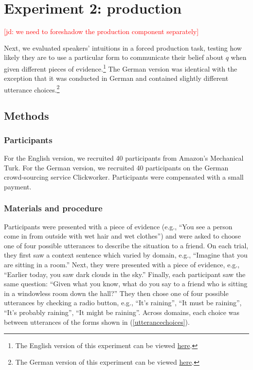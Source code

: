 \documentclass[11pt]{article}
\newcommand{\jd}[1]{\textcolor{Red}{[jd: #1]}}
\newcommand{\eref}[1]{(\ref{#1})}
\begin{document}
\section{Experiment 2: production}

\jd{we need to foreshadow the production component separately}

Next, we evaluated speakers' intuitions in a forced production task, testing how likely they are to use a particular form to communicate their belief about $q$ when given different pieces of evidence.\footnote{The English version of this experiment can be viewed \href{http://stanford.edu/~jdegen/71_modals_forced_production/modals.html}{here}.} The German version was identical with the exception that it was conducted in German and contained slightly different utterance choices.\footnote{The German version of this experiment can be viewed \href{http://web.stanford.edu/~jdegen/cgi-bin/3_dp_production/modals.html}{here}.}

\subsection{Methods}

\subsubsection{Participants}

For the English version, we recruited 40 participants from Amazon's Mechanical Turk. For the German version, we recruited 40 participants on the German crowd-sourcing service Clickworker. Participants were compensated with a small payment.

\subsubsection{Materials and procedure}

Participants were presented with a piece of evidence (e.g., ``You see a person come in from outside with wet hair and wet clothes'') and were asked to choose one of four possible utterances to describe the situation to a friend. On each trial, they first saw a context sentence which varied by domain, e.g., ``Imagine that you are sitting in a room.'' Next, they were presented with a piece of evidence, e.g., ``Earlier today, you saw dark clouds in the sky.'' Finally, each participant saw the same question: ``Given what you know, what do you say to a friend who is sitting in a windowless room down the hall?'' They then chose one of four possible utterances by checking a radio button, e.g., ``It's raining'', ``It must be raining'', ``It's probably raining'', ``It might be raining''. Across domains, each choice was between utterances of the forms shown in \eref{utterancechoices}.
\end{document}
